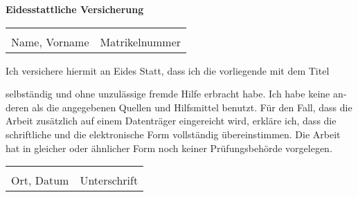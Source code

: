 \begin{otherlanguage}{ngerman}

\begingroup
\thispagestyle{empty}
\begin{center}
	\large
	\textbf{Eidesstattliche Versicherung}
\end{center}

\vspace{0.5cm}

\begin{tabular}{@{}p{8cm}p{5.8cm}}
	\underline{\hspace{6cm}} & \underline{\hspace{5.8cm}} \\
	\vspace{0.02cm}Name, Vorname & \vspace{0.02cm}Matrikelnummer \\
\end{tabular}
\vspace{0.5cm}

Ich versichere hiermit an Eides Statt, dass ich die vorliegende {\thesistypegerman} mit dem Titel

{\makeatletter{\emph{{\@title}}}\makeatother}

selbständig und ohne unzulässige fremde Hilfe erbracht habe. Ich habe keine anderen als die angegebenen Quellen und Hilfsmittel benutzt. Für den Fall, dass die Arbeit zusätzlich auf einem Datenträger eingereicht wird, erkläre ich, dass die schriftliche und die elektronische Form vollständig übereinstimmen. Die Arbeit hat in gleicher oder ähnlicher Form noch keiner Prüfungsbehörde vorgelegen.

\vspace{0.3cm}

\begin{tabular}{@{}p{8cm}p{5.8cm}}
	\underline{\smash{Aachen, den \today}} & \underline{\hspace{5.8cm}}\\
	\vspace{0.02cm}Ort, Datum & \vspace{0.02cm}Unterschrift \\
\end{tabular}

\vspace{1cm}


\end{otherlanguage}
